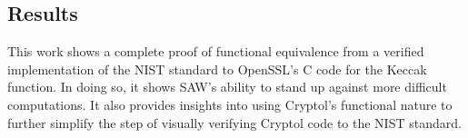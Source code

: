 \subsection{Results}
This work shows a complete proof of functional equivalence from a verified implementation of the NIST standard to OpenSSL's C code for the Keccak function.
In doing so, it shows SAW's ability to stand up against more difficult computations.
It also provides insights into using Cryptol's functional nature to further simplify the step of visually verifying Cryptol code to the NIST standard.